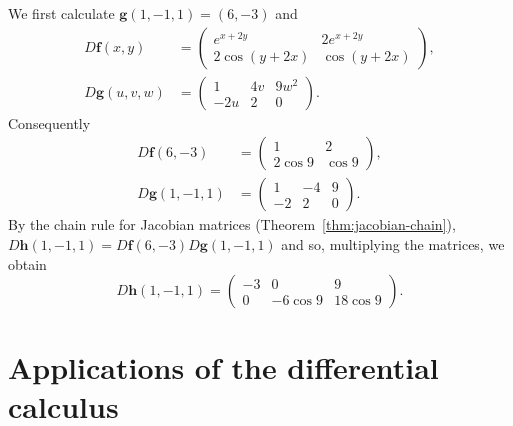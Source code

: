 \begin{solution}
    We first calculate \(\mathbf{g}(1,-1,1) = (6,-3)\) and
    \[
        \begin{aligned}
            D\mathbf{f}(x,y)   & =
            \begin{pmatrix}
                e^{x+2y}     & 2 e^{x+2y} \\
                2 \cos(y+2x) & \cos(y+2x)
            \end{pmatrix}, \\
            D\mathbf{g}(u,v,w) & =
            \begin{pmatrix}
                1   & 4v & 9w^2 \\
                -2u & 2  & 0
            \end{pmatrix}.
        \end{aligned}
    \]
    Consequently
    \[
        \begin{aligned}
            D\mathbf{f}(6,-3)   & =
            \begin{pmatrix}
                1        & 2      \\
                2 \cos 9 & \cos 9
            \end{pmatrix}, \\
            D\mathbf{g}(1,-1,1) & =
            \begin{pmatrix}
                1  & -4 & 9 \\
                -2 & 2  & 0
            \end{pmatrix}.
        \end{aligned}
    \]
    By the chain rule for Jacobian matrices (Theorem~\ref{thm:jacobian-chain}),
    \( D\mathbf{h}(1,-1,1) = D\mathbf{f}(6,-3)  D\mathbf{g}(1,-1,1) \)
    and so, multiplying the matrices, we obtain
    $$D\mathbf{h}(1,-1,1) =
        \begin{pmatrix}
            -3 & 0        & 9        \\
            0  & -6\cos 9 & 18\cos 9
        \end{pmatrix}.
    $$
\end{solution}


\section{Applications of the differential calculus}


